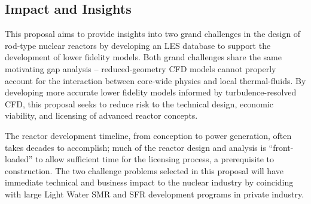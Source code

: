 




\vspace{-.25in}
\subsection{Impact and Insights}
\vspace{-.2in}

This proposal aims to provide insights into two grand challenges in the design
of rod-type nuclear reactors by developing an LES database to support the
development of lower fidelity models. Both grand challenges share the same
motivating gap analysis -- reduced-geometry CFD models cannot properly account
for the interaction between core-wide physics and local thermal-fluids. By
developing more accurate lower fidelity models informed by turbulence-resolved
CFD, this proposal seeks to reduce risk to the technical design, economic
viability, and licensing of advanced reactor concepts. 

The reactor development timeline, from conception to power generation, often
takes decades to accomplish; much of the reactor design and analysis is
``front-loaded'' to allow sufficient time for the licensing process, a
prerequisite to construction. The two challenge problems selected in this
proposal will have immediate technical and business impact to the nuclear
industry by coinciding with large Light Water SMR and SFR development programs
in private industry.

